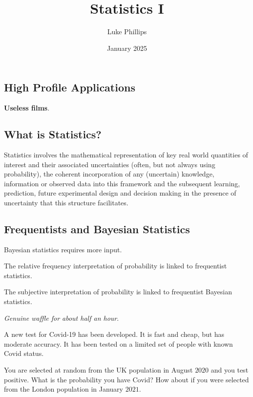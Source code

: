 \documentclass[10pt, a4paper]{article}
\title{Statistics I}
\author{Luke Phillips}
\date{January 2025}
\begin{document}
\maketitle

\newpage

\tableofcontents

\newpage

\section{}

\subsection{High Profile Applications}
\textbf{Useless films}.

\subsection{What is Statistics?}
Statistics involves the mathematical representation of key real world quantities of interest and their associated uncertainties
(often,
but not always using probability),
the coherent incorporation of any
(uncertain)
knowledge,
information or observed data into this framework and the subsequent learning,
prediction,
future experimental design and decision making in the presence of uncertainty that this structure facilitates.

\subsection{Frequentists and Bayesian Statistics}
Bayesian statistics requires more input.

The relative frequency interpretation of probability is linked to frequentist statistics.

The subjective interpretation of probability is linked to frequentist Bayesian statistics.

\textit{Genuine waffle for about half an hour}.

\begin{example}
    A new test for Covid-19 has been developed.
    It is fast and cheap,
    but has moderate accuracy.
    It has been tested on a limited set of people with known Covid status.
    
    You are selected at random from the UK population in August $2020$ and you test positive.
    What is the probability you have Covid?
    How about if you were selected from the London population in January $2021$.
\end{example}
\end{document}
